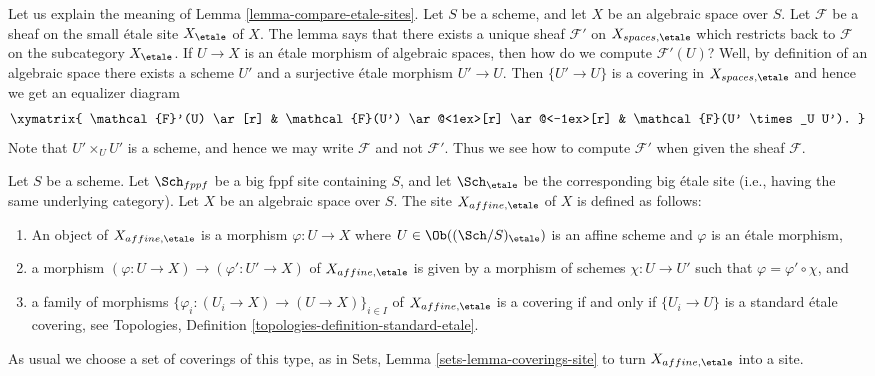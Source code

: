 \begin{remark}
\label{remark-explain-equivalence}
Let us explain the meaning of Lemma \ref{lemma-compare-etale-sites}.
Let $S$ be a scheme, and let $X$ be an algebraic space over $S$.
Let $\mathcal{F}$ be a sheaf on the small \'etale site $X_\etale$ of
$X$. The lemma says that there exists a unique sheaf $\mathcal{F}'$ on
$X_{spaces, \etale}$ which restricts back to $\mathcal{F}$ on the
subcategory $X_\etale$. If $U \to X$ is an \'etale morphism of
algebraic spaces, then how do we compute $\mathcal{F}'(U)$? Well, by definition
of an algebraic space there exists a scheme $U'$ and a surjective
\'etale morphism $U' \to U$. Then $\{U' \to U\}$ is a covering in
$X_{spaces, \etale}$ and hence we get an equalizer diagram
$$
\xymatrix{
\mathcal{F}'(U) \ar[r] &
\mathcal{F}(U') \ar@<1ex>[r] \ar@<-1ex>[r] &
\mathcal{F}(U' \times_U U').
}
$$
Note that $U' \times_U U'$ is a scheme, and hence we may
write $\mathcal{F}$ and not $\mathcal{F}'$.
Thus we see how to compute $\mathcal{F}'$
when given the sheaf $\mathcal{F}$.
\end{remark}

\begin{definition}
\label{definition-affine-etale-site}
Let $S$ be a scheme.
Let $\Sch_{fppf}$ be a big fppf site containing $S$,
and let $\Sch_\etale$ be the corresponding big \'etale site
(i.e., having the same underlying category).
Let $X$ be an algebraic space over $S$.
The site {\it $X_{affine, \etale}$} of $X$ is defined as follows:
\begin{enumerate}
\item An object of $X_{affine, \etale}$ is a morphism
$\varphi : U \to X$ where $U \in \Ob((\Sch/S)_\etale)$ is an affine scheme and
$\varphi$ is an \'etale morphism,
\item a morphism $(\varphi : U \to X) \to (\varphi' : U' \to X)$ of
$X_{affine, \etale}$ is given by a morphism of schemes
$\chi : U \to U'$ such that $\varphi = \varphi' \circ \chi$, and
\item a family of morphisms
$\{\varphi_i : (U_i \to X) \to (U \to X)\}_{i \in I}$
of $X_{affine, \etale}$ is a covering if and only if
$\{U_i \to U\}$ is a standard \'etale covering, see
Topologies, Definition \ref{topologies-definition-standard-etale}.
\end{enumerate}
As usual we choose a set of coverings of this type, as in
Sets, Lemma \ref{sets-lemma-coverings-site}
to turn $X_{affine, \etale}$ into a site.
\end{definition}

